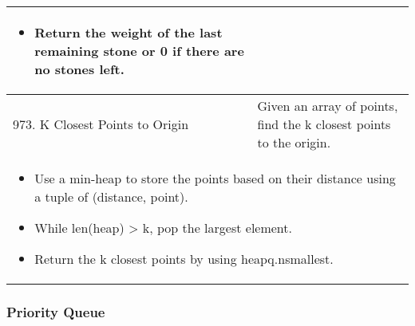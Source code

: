 \begin{summary}
\begin{center}
\begin{tabular}{ll}
{\begin{itemize}
                        \item Return the weight of the last remaining stone or 0 if there are no stones left.
                    \end{itemize}
                } \\
            \midrule
            973. K Closest Points to Origin & Given an array of points, find the k closest points to the origin. \\
            \multicolumn{2}{p{\linewidth}}{
                    \begin{itemize}
                        \item Use a min-heap to store the points based on their distance using a tuple of (distance, point).
                        \item While len(heap) > k, pop the largest element.
                        \item Return the k closest points by using heapq.nsmallest.
                    \end{itemize}
                } \\
            \midrule
        \end{tabular}
    \end{center}
\end{summary}


\subsubsection{Priority Queue}
\begin{algo}
    
\end{algo}